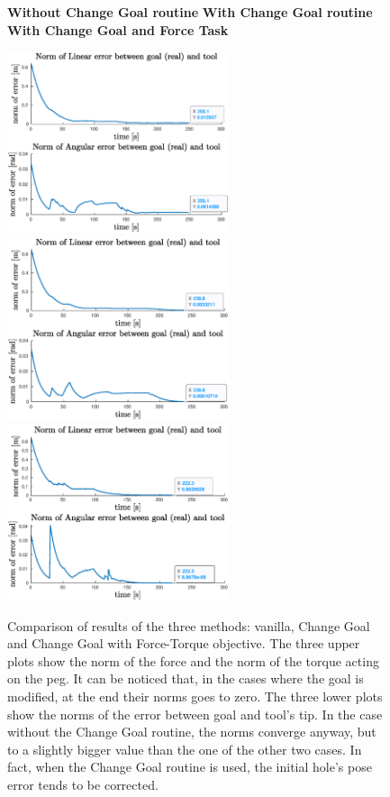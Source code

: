 \begin{figure}[H]
	\vspace{10px}
	\centerline{
		\hspace{5px}
		\textbf{Without Change Goal routine} 
		\hspace{35px}
		\textbf{With Change Goal routine}
		\hspace{25px}
		\textbf{With Change Goal and Force Task} 
	}
	\centerline{
		\includegraphics[width=6.5cm]{error_nothing/error.eps}
		\includegraphics[width=6.5cm]{error_goal/errorNorm.eps}
		\includegraphics[width=6.5cm]{error_all/errorNorm.eps}
	}
	\vspace{10px}
	\caption[Plots of comparisons with and without change goal and force objective]{Comparison of results of the three methods: vanilla, Change Goal and Change Goal with Force-Torque objective. The three upper plots show the norm of the force and the norm of the torque acting on the peg. It can be noticed that, in the cases where the goal is modified, at the end their norms goes to zero. The three lower plots show the norms of the error between goal and tool's tip. In the case without the Change Goal routine, the norms converge anyway, but to a slightly bigger value than the one of the other two cases. In fact, when the Change Goal routine is used, the initial hole's pose error tends to be corrected.}
	\label{fig:comparison_final}
\end{figure}

